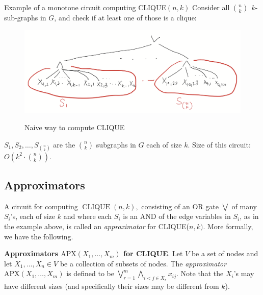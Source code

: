 \begin{trailer}{Example of a monotone circuit computing CLIQUE$(n, k)$}
Consider  all $\binom{n}{k} ~~ k$-sub-graphs in $G$, and check if at least one of those is a clique:

\begin{figure}
    \centering
    \includegraphics[width=0.75\linewidth]{images/k-clique-simple-circuit.png}
    \label{fig:clique-naive}
    \caption{Naive way to compute CLIQUE}
\end{figure}

$S_1, S_2, \ldots, S_{\binom{n}{k}}$ are the $\binom{n}{k}$ subgraphs in $G$ each of size $k$.
Size of this circuit: $O\left(k^2 \cdot\binom{n}{k}\right)$.
\end{trailer}


\newcommand{\APPX}{\ensuremath{\mathrm{APX}}}



\subsection{Approximators}

A  circuit for computing $\operatorname{CLIQUE}  (n, k),$ consisting of an OR gate $\bigvee$ of many  $S_i$'s, each of size $k$ and where each $S_i$ is an AND of the edge variables in $S_i$, as in the example above, is called an \textit{approximator} for CLIQUE($n, k)$. More formally, we have the following. 


\begin{tcolorbox}[colframe=white, colback=red!5, boxrule=0mm, sharp corners]
\textbf{Approximators $\APPX\left(X_1, \ldots, X_m\right)$ for CLIQUE}.
Let $V$ be a set of nodes and let $X_1,\dots,X_n\in V$ be a collection of subsets of nodes. The \emph{approximator} $\APPX\left(X_1, \ldots, X_m\right)$ is defined to be 
$\bigvee_{r=1}^m\bigwedge_{i<j \in X_r} x_{ij}$.
Note that the $X_i$'s may have different sizes (and specifically their sizes may be different from $k$).
\end{tcolorbox}
 
